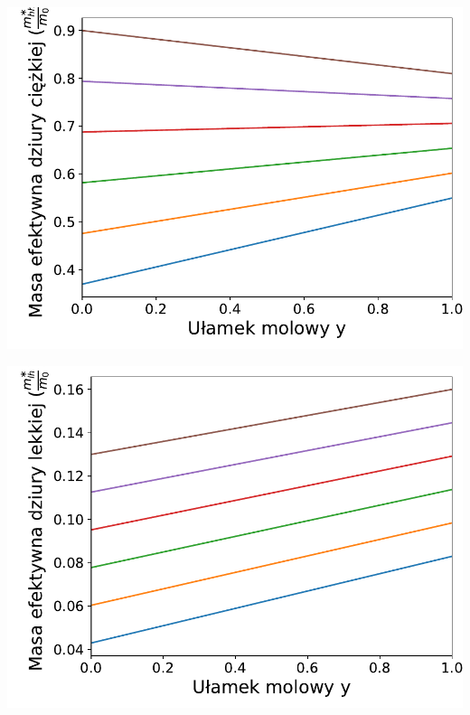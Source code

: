 \documentclass[12pt,openany,a4paper]{book}
\begin{document}
\begin{minipage}[t]{0.5\textwidth}
	\includegraphics[width = \linewidth]{Figures/quaternary/quat_m_hh_x.pdf}\label{fig:quat_mhh_x}
\end{minipage}
\begin{minipage}[t]{0.5\textwidth}
	\includegraphics[width = \linewidth]{Figures/quaternary/quat_m_lh_x.pdf}\label{fig:quat_mlh_x}
\end{minipage}
\end{document}
